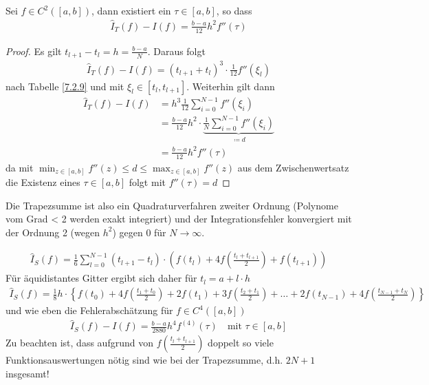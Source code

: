 \begin{Leme}\label{7.2.11}
  Sei $f\in C^2([a,b])$, dann existiert ein $\tau \in[a,b]$, so dass
  \begin{gather}
    \hat{I}_T(f) -I(f) = \frac{b-a}{12}h^2 f''(\tau)
    \label{VII.2.12}
  \end{gather}

  \begin{proof}
    Es gilt $t_{l+1}-t_l = h= \frac{b-a}{N}$.
    Daraus folgt
    \begin{gather*}
      \hat{I}_T(f)-I(f)=(t_{l+1}+t_l)^3\cdot\frac{1}{12}f''(\xi_l)
    \end{gather*}
    nach Tabelle \ref{7.2.9} und mit
    $\xi_l\in[t_l,t_{l+1}]$.
    Weiterhin gilt dann
    \begin{align*}
      \hat{I}_T(f) - I(f) &= h^3\frac{1}{12}\sum_{i=0}^{N-1}f''(\xi_i)\\
                          &= \frac{b-a}{12}h^2 \cdot \underbrace{
                            \frac{1}{N}\sum_{i=0}^{N-1}f''(\xi_i)
                            }_{\coloneqq d}\\
                          &= \frac{b-a}{12}h^2 f''(\tau)
    \end{align*}
    da mit $\min_{z\in[a,b]} f''(z) \leq d \leq \max_{z\in[a,b]}f''(z)$
    aus dem Zwischenwertsatz die Existenz eines $\tau\in[a,b]$ folgt
    mit $f''(\tau) = d$
  \end{proof}
\end{Leme}

Die Trapezsumme ist also ein
Quadraturverfahren zweiter Ordnung
(Polynome vom Grad < 2 werden exakt integriert) und der
Integrationsfehler konvergiert mit der Ordnung 2 (wegen $h^2$) gegen 0
für $N\longrightarrow \infty$.

\begin{gather}
  \hat{I}_S(f) = \frac{1}{6}\sum_{l=0}^{N-1} (t_{l+1}-t_l)
  \cdot \left(f(t_l) +4f\left(\frac{t_l+t_{l+1}}{2}\right) + f(t_{l+1})
  \right)
  \label{VII.2.13}
\end{gather}
Für äquidistantes Gitter ergibt sich daher für $t_l=a+l\cdot h$
\begin{gather}
  \hat{I}_S(f) = \frac{1}{8}h\cdot
  \left\{
    f(t_0)+4f\left(\frac{t_1+t_0}{2}\right) 
    +2f(t_1) + 3f\left(\frac{t_2+t_1}{2}\right)
    + \ldots +2f(t_{N-1})
    +4f\left(\frac{t_{N-1}+t_N}{2}\right)
  \right\}
  \label{VII.2.14}
\end{gather}
und wie eben die Fehlerabschätzung
für $f\in C^4([a,b])$
\begin{gather}
  \hat{I}_S(f) -I(f) =
  \frac{b-a}{2880}h^4f^{(4)}(\tau)
  \quad \text{mit } \tau\in[a,b]
  \label{VII.2.15}
\end{gather}
Zu beachten ist, dass aufgrund von
$f\left(\frac{t_l+t_{l+1}}{2}\right)$
doppelt so viele Funktionsauswertungen nötig sind
wie bei der Trapezsumme, d.h. $2N+1$ insgesamt!

